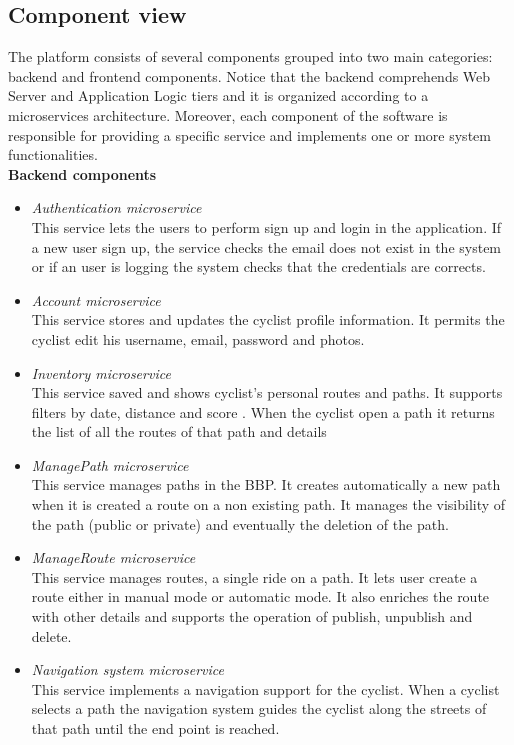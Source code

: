 \subsection{Component view}
The platform consists of several components grouped into two main categories: backend and frontend components. Notice that the backend comprehends Web Server and Application Logic tiers and it is organized according to a microservices architecture. Moreover, each component of the software is responsible for providing a specific service and implements one or more system functionalities.\\[8pt]
\textbf{Backend components}
\begin{itemize}
    \item \textit{Authentication microservice}
    \\ This service lets the users to perform sign up and login in the application. If a new user sign up, the service checks the email does not exist in the system or if an user is logging the system checks that the credentials are corrects.
    \item \textit{Account microservice}
    \\ This service stores and updates the cyclist profile information. It permits the cyclist edit his username, email, password and photos.
    \item \textit{Inventory microservice}
    \\ This service saved and shows cyclist's personal routes and paths. It supports filters by date, distance and score . When the cyclist open a path it returns the list of all the routes of that path and details
    \item \textit{ManagePath microservice}
    \\This service manages paths in the BBP. It creates automatically a new path when it is created a route on a non existing path. It manages the visibility of the path (public or private) and eventually the deletion of the path.
    \item \textit{ManageRoute microservice}
    \\This service manages routes, a single ride on a path. It lets user create a route either in manual mode or automatic mode. It also enriches the route with other details and supports the operation of publish, unpublish and delete.
    \item \textit{Navigation system microservice} 
    \\ This service implements a navigation support for the cyclist. When a cyclist selects a path the navigation system guides the cyclist along the streets of that path until the end point is reached.

\end{itemize}
